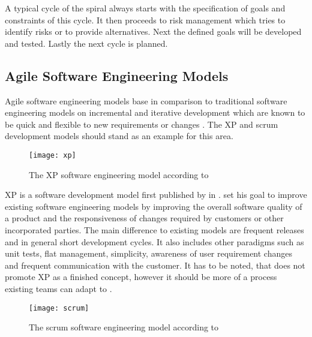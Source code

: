 A typical cycle of the spiral always starts with the specification of goals and
constraints of this cycle. It then proceeds to risk management which tries to
identify risks or to provide alternatives. Next the defined goals will be
developed and tested. Lastly the next cycle is planned.


\subsection{Agile Software Engineering Models} %

Agile software engineering models base in comparison to traditional software
engineering models on incremental and iterative development which are known to
be quick and flexible to new requirements or changes \cite{Beck1999}. The
\ac{XP} and scrum development models should stand as an example for this area.

\begin{figure}[htbp]
  \centering
  \texttt{[image: xp]}
  \caption{The \ac{XP} software engineering model according to \textcite{Beck1999a}}
\end{figure}

\ac{XP} is a software development model first published by
\citeauthor{Beck1999} \cite{Beck1999a} in \citeyear{Beck1999}.
\citeauthor{Beck1999} set his goal to improve existing software engineering
models by improving the overall software quality of a product and the
responsiveness of changes required by customers or other incorporated parties.
The main difference to existing models are frequent releases and in general
short development cycles. It also includes other paradigms such as unit tests,
flat management, simplicity, awareness of user requirement changes and frequent
communication with the customer. It has to be noted, that \citeauthor{Beck1999}
does not promote \ac{XP} as a finished concept, however it should be more of a
process existing teams can adapt to \cite{Beck1999}.

\begin{figure}[htbp]
  \centering
  \texttt{[image: scrum]}
  \caption{The scrum software engineering model according to \textcite{Schwaber1995}}
\end{figure}


